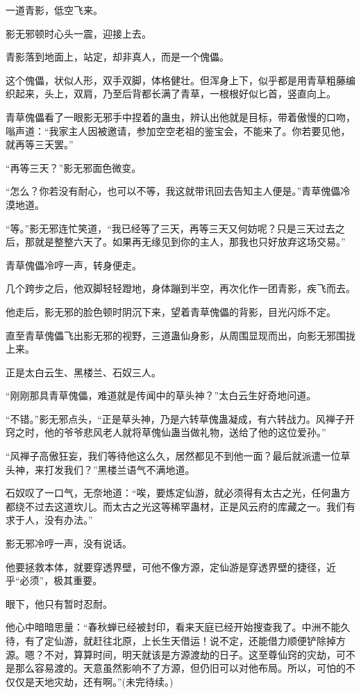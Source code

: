 \begin{this_body}
一道青影，低空飞来。

影无邪顿时心头一震，迎接上去。

青影落到地面上，站定，却非真人，而是一个傀儡。

这个傀儡，状似人形，双手双脚，体格健壮。但浑身上下，似乎都是用青草粗藤编织起来，头上，双肩，乃至后背都长满了青草，一根根好似匕首，竖直向上。

青草傀儡看了一眼影无邪手中捏着的蛊虫，辨认出他就是目标，带着傲慢的口吻，嗡声道：“我家主人因被邀请，参加空空老祖的鉴宝会，不能来了。你若要见他，就再等三天罢。”

“再等三天？”影无邪面色微变。

“怎么？你若没有耐心，也可以不等，我这就带讯回去告知主人便是。”青草傀儡冷漠地道。

“等。”影无邪连忙笑道，“我已经等了三天，再等三天又何妨呢？只是三天过去之后，那就是整整六天了。如果再无缘见到你的主人，那我也只好放弃这场交易。”

青草傀儡冷哼一声，转身便走。

几个跨步之后，他双脚轻轻蹬地，身体蹦到半空，再次化作一团青影，疾飞而去。

他走后，影无邪的脸色顿时阴沉下来，望着青草傀儡的背影，目光闪烁不定。

直至青草傀儡飞出影无邪的视野，三道蛊仙身影，从周围显现而出，向影无邪围拢上来。

正是太白云生、黑楼兰、石奴三人。

“刚刚那具青草傀儡，难道就是传闻中的草头神？”太白云生好奇地问道。

“不错。”影无邪点头，“正是草头神，乃是六转草傀蛊凝成，有六转战力。风禅子开窍之时，他的爷爷悲风老人就将草傀仙蛊当做礼物，送给了他的这位爱孙。”

“风禅子高傲狂妄，我们等待他这么久，居然都见不到他一面？最后就派遣一位草头神，来打发我们？”黑楼兰语气不满地道。

石奴叹了一口气，无奈地道：“唉，要炼定仙游，就必须得有太古之光，任何蛊方都绕不过去这道坎儿。而太古之光这等稀罕蛊材，正是风云府的库藏之一。我们有求于人，没有办法。”

影无邪冷哼一声，没有说话。

他要拯救本体，就要穿透界壁，可他不像方源，定仙游是穿透界壁的捷径，近乎“必须”，极其重要。

眼下，他只有暂时忍耐。

他心中暗暗思量：“春秋蝉已经被封印，看来天庭已经开始搜查我了。中洲不能久待，有了定仙游，就赶往北原，上长生天借运！说不定，还能借力顺便铲除掉方源。嗯？不对，算算时间，明天就该是方源渡劫的日子。这至尊仙窍的灾劫，可不是那么容易渡的。天意虽然影响不了方源，但仍旧可以对他布局。所以，可怕的不仅仅是天地灾劫，还有啊。”(未完待续。)

\end{this_body}


